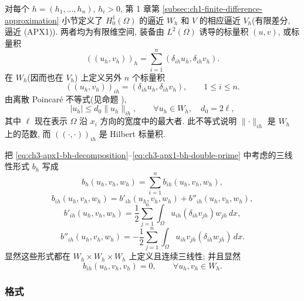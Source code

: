对每个 $h=(h_1,\ldots,h_n)$, $h_i>0$, 第 1 章第 \ref{subsec:ch1-finite-difference-approximation} 小节定义了 $H_0^1(\Omega)$ 的逼近 $W_h$ 和 $V$ 的相应逼近 $V_h$(有限差分, 逼近 (APX1)). 两者均为有限维空间, 装备由 $L^2(\Omega)$ 诱导的标量积 $(u,v)$, 或标量积
\[
((u_h,v_h))_h=\sum_{i=1}^n(\delta_{ih}u_h,\delta_{ih}v_h).
\]
在 $W_h$(因而也在 $V_h$) 上定义另外 $n$ 个标量积
\begin{equation}
((u_h,v_h))_{ih}=(\delta_{ih}u_h,\delta_{ih}v_h),
\qquad1\leq i\leq n.
\label{eq:ch3-projection-directional-inner-products}
\end{equation}
由离散 Poincar\'e 不等式(见命题 ),
\begin{equation}
|u_h|\leq d_0\lVert u_h\rVert_{ih},
\qquad\forall u_h\in W_h,\quad d_0=2\ell,
\label{eq:ch3-projection-directional-poincare}
\end{equation}
其中 $\ell$ 现在表示 $\Omega$ 沿 $x_i$ 方向的宽度中的最大者. 此不等式说明 $\lVert\cdot\rVert_{ih}$ 是 $W_h$ 上的范数, 而 $((\cdot,\cdot))_{ih}$ 是 Hilbert 标量积.

把 \eqref{eq:ch3-apx1-bh-decomposition}--\eqref{eq:ch3-apx1-bh-double-prime} 中考虑的三线性形式 $b_h$ 写成
\begin{equation}
b_h(u_h,v_h,w_h)=\sum_{i=1}^n b_{ih}(u_h,v_h,w_h),
\label{eq:ch3-projection-bh-directional-sum}
\end{equation}
\begin{equation}
b_{ih}(u_h,v_h,w_h)
=b'_{ih}(u_h,v_h,w_h)+b''_{ih}(u_h,v_h,w_h),
\label{eq:ch3-projection-bih-decomposition}
\end{equation}
\begin{equation}
b'_{ih}(u_h,v_h,w_h)
=\frac12\sum_{j=1}^n\int_\Omega u_{ih}(\delta_{ih}v_{jh})w_{jh}\,dx,
\label{eq:ch3-projection-bih-prime}
\end{equation}
\begin{equation}
b''_{ih}(u_h,v_h,w_h)
=-\frac12\sum_{j=1}^n\int_\Omega u_{ih}v_{jh}(\delta_{ih}w_{jh})\,dx.
\label{eq:ch3-projection-bih-double-prime}
\end{equation}
显然这些形式都在 $W_h\times W_h\times W_h$ 上定义且连续三线性; 并且显然
\begin{equation}
b_{ih}(u_h,v_h,v_h)=0,\qquad
\forall u_h,v_h\in W_h.
\label{eq:ch3-projection-bih-cancellation}
\end{equation}

\subsubsection{格式}
\label{subsubsec:ch3-projection-discrete-scheme}

